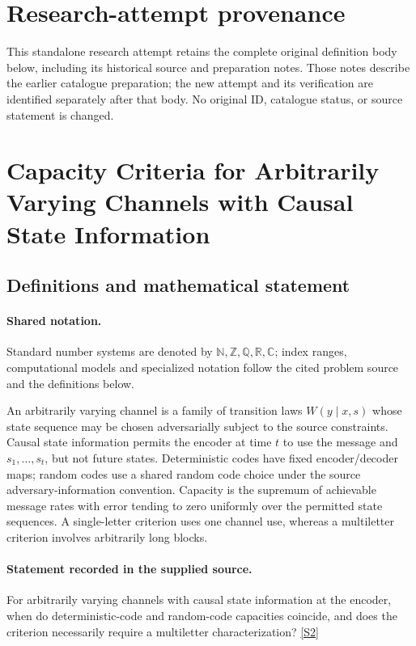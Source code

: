 \documentclass[11pt]{article}
\begin{document}
\section*{Research-attempt provenance}
This standalone research attempt retains the complete original definition body below,
including its historical source and preparation notes. Those notes describe the
earlier catalogue preparation; the new attempt and its verification are identified
separately after that body. No original ID, catalogue status, or source statement is changed.

\section{Capacity Criteria for Arbitrarily Varying Channels with Causal State Information}\label{statement}

\subsection{Definitions and mathematical statement}

\paragraph{Shared notation.}Standard number systems are denoted by $\mathbb N,\mathbb Z,\mathbb Q,\mathbb R,\mathbb C$; index ranges, computational models and specialized notation follow the cited problem source and the definitions below.


An arbitrarily varying channel is a family of transition laws $W(y\mid x,s)$ whose state sequence may be chosen adversarially subject to the source constraints. Causal state information permits the encoder at time $t$ to use the message and $s_1,\ldots,s_t$, but not future states. Deterministic codes have fixed encoder/decoder maps; random codes use a shared random code choice under the source adversary-information convention. Capacity is the supremum of achievable message rates with error tending to zero uniformly over the permitted state sequences. A single-letter criterion uses one channel use, whereas a multiletter criterion involves arbitrarily long blocks.
\paragraph{Statement recorded in the supplied source.}
For arbitrarily varying channels with causal state information at the encoder, when do deterministic-code and random-code capacities coincide, and does the criterion necessarily require a multiletter characterization? \href{https://doi.org/10.4171/owr/2022/14}{[S2]}
\end{document}
